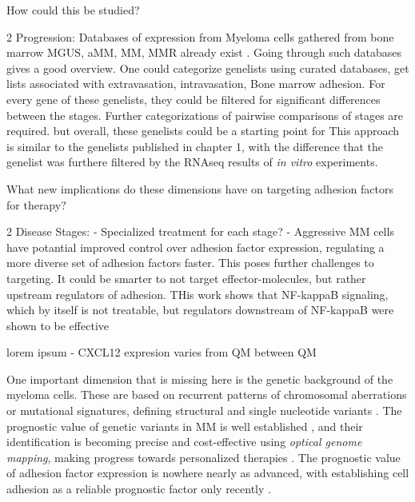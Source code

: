 How could this be studied?

2 Progression: Databases of expression from Myeloma cells gathered from bone
marrow \ac{MGUS}, \ac{aMM}, \ac{MM}, \ac{MMR} already exist
\citet{akhmetzyanovaDynamicCD138Surface2020,
      seckingerCD38ImmunotherapeuticTarget2018}. Going through such databases gives a
good overview. One could categorize genelists using curated databases, get lists
associated with extravasation, intravasation, Bone marrow adhesion. For every
gene of these genelists, they could be filtered for significant differences
between the stages. Further categorizations of pairwise comparisons of stages
are required. but overall, these genelists could be a starting point for This
approach is similar to the genelists published in chapter 1, with the difference
that the genelist was furthere filtered by the RNAseq results of \textit{in
      vitro} experiments.



What new implications do these dimensions have on targeting adhesion factors for
therapy?


2 Disease Stages:
- Specialized treatment for each stage?
- Aggressive MM cells have potantial improved control over adhesion factor expression,
regulating a more diverse set of adhesion factors faster. This poses further challenges to targeting.
It could be smarter to not target effector-molecules, but rather upstream regulators of adhesion.
THis work shows that NF-kappaB signaling, which by itself is not treatable, but regulators
downstream of NF-kappaB were shown to be effective \cite{adamikEZH2HDAC1Inhibition2017,adamikXRK3F2InhibitionP62ZZ2018}




\unnsubsection{\cadddiversitytitle}%
\label{sec:discussion_cadddiversity}%
lorem ipsum
- CXCL12 expresion varies from QM between QM

One important dimension that is missing here is the genetic background of the
myeloma cells. These are based on recurrent patterns of chromosomal aberrations
or mutational signatures, defining structural and single nucleotide variants
\cite{kumarMultipleMyelomasCurrent2018a,
      hoangMutationalProcessesContributing2019}. The prognostic value of genetic
variants in MM is well established \cite{sharmaPrognosticRoleMYC2021}, and their
identification is becoming precise and cost-effective using \emph{optical
      genome mapping}, making progress towards personalized therapies
\cite{zouComprehensiveApproachEvaluate2024,
      budurleanIntegratingOpticalGenome2024}. The prognostic value of adhesion factor
expression is nowhere nearly as advanced, with establishing cell adhesion as a
reliable prognostic factor only recently
\cite{huDevelopmentCellAdhesionbased2024}.



